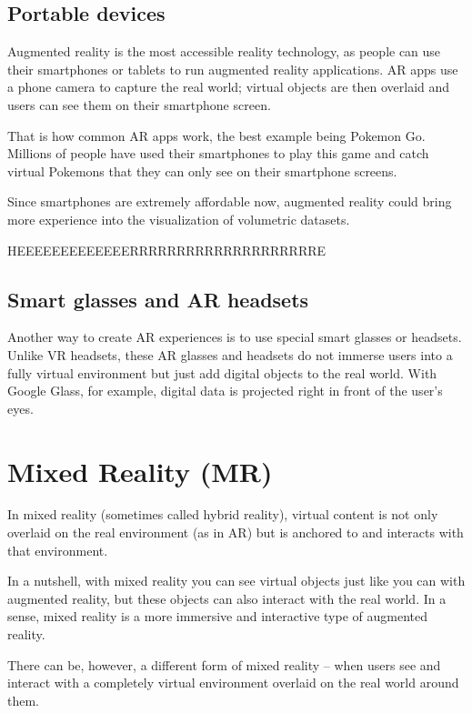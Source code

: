 \subsection{Portable devices}

Augmented reality is the most accessible reality technology, as people can use their smartphones or tablets to run augmented reality applications. AR apps use a phone camera to capture the real world; virtual objects are then overlaid and users can see them on their smartphone screen.


That is how common AR apps work, the best example being Pokemon Go. Millions of people have used their smartphones to play this game and catch virtual Pokemons that they can only see on their smartphone screens. 


Since smartphones are extremely affordable now, augmented reality could bring more experience into the visualization of volumetric datasets. 

HEEEEEEEEEEEEERRRRRRRRRRRRRRRRRRRRE

\subsection{Smart glasses and AR headsets}

Another way to create AR experiences is to use special smart glasses or headsets. Unlike VR headsets, these AR glasses and headsets do not immerse users into a fully virtual environment but just add digital objects to the real world. With Google Glass, for example, digital data is projected right in front of the user's eyes.

\section{ Mixed Reality (MR)}

In mixed reality (sometimes called hybrid reality), virtual content is not only overlaid on the real environment (as in AR) but is anchored to and interacts with that environment.

In a nutshell, with mixed reality you can see virtual objects just like you can with augmented reality, but these objects can also interact with the real world. In a sense, mixed reality is a more immersive and interactive type of augmented reality.

There can be, however, a different form of mixed reality – when users see and interact with a completely virtual environment overlaid on the real world around them.

